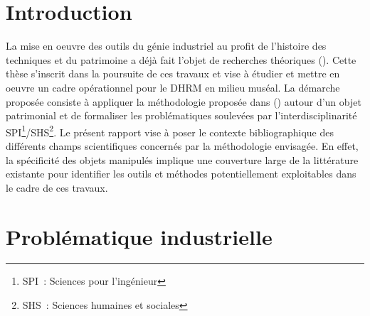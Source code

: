 \documentclass[a4paper,11pt,french]{article}
\begin{document}
\newpage
\tableofcontents
\newpage
\section{Introduction}

La mise en oeuvre des outils du génie industriel au profit de l'histoire des techniques et du patrimoine a déjà fait l'objet de recherches théoriques (). Cette thèse s'inscrit dans la poursuite de ces travaux et vise à étudier et mettre en oeuvre un cadre opérationnel pour le DHRM en milieu muséal.
La démarche proposée consiste à appliquer la méthodologie proposée dans () autour d'un objet patrimonial et de formaliser les problématiques soulevées par l'interdisciplinarité SPI\footnote{SPI~: Sciences pour l'ingénieur}/SHS\footnote{SHS~: Sciences humaines et sociales}.
Le présent rapport vise à poser le contexte bibliographique des différents champs scientifiques concernés par la méthodologie envisagée. En effet, la spécificité des objets manipulés implique une couverture large de la littérature existante pour identifier les outils et méthodes potentiellement exploitables dans le cadre de ces travaux.

\section{Problématique industrielle}
\end{document}
